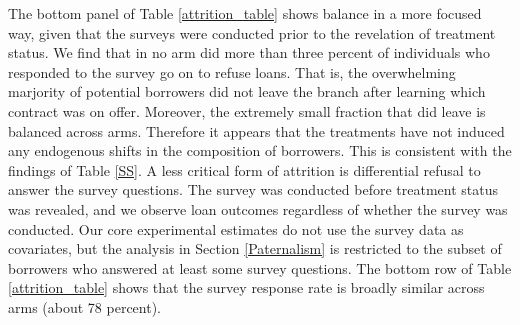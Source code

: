 \documentclass[ecta,nameyear,final]{econsocart}
\begin{document}
The bottom panel of Table \ref{attrition_table} shows balance in a more focused way, given that the surveys were conducted prior to the revelation of treatment status. We find that in no arm did more than three percent of individuals who responded to the survey go on to refuse loans. That is, the overwhelming marjority of potential borrowers did not leave the branch after learning which contract was on offer. Moreover, the extremely small fraction that did leave is balanced across arms.  Therefore it appears that the treatments have not induced any endogenous shifts in the composition of borrowers. This is consistent with the findings of Table \ref{SS}.
A less critical form of attrition is differential refusal to answer the survey questions.  The survey was conducted before treatment status was revealed, and we observe loan outcomes regardless of whether the survey was conducted.  Our core experimental estimates do not use the survey data as covariates, but the analysis in Section \ref{Paternalism} is restricted to the subset of borrowers who answered at least some survey questions. The bottom row of Table \ref{attrition_table} shows that the survey response rate is broadly similar across arms (about 78 percent). 
\end{document}
